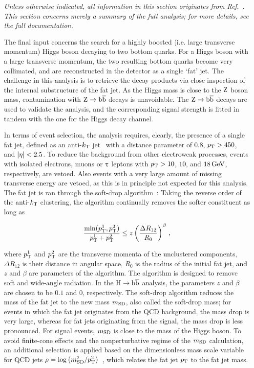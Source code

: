 \emph{%
Unless otherwise indicated, all information in this section originates from Ref.~\cite{Sirunyan:2017dgc}. This section concerns merely a summary of the full analysis; for more details, see the full documentation.
}

The final input concerns the search for a highly boosted (i.e. large transverse momentum) Higgs boson decaying to two bottom quarks.
% 
For a Higgs boson with a large transverse momentum, the two resulting bottom quarks become very collimated, and are reconstructed in the detector as a single `fat' jet.
% 
The challenge in this analysis is to retrieve the decay products via close inspection of the internal substructure of the fat jet.
% 
As the Higgs mass is close to the $\mathrm{Z}$ boson mass, contamination with $\mathrm{Z}\to\mathrm{b}\overline{\mathrm{b}}$ decays is unavoidable.
% 
The $\mathrm{Z}\to\mathrm{b}\overline{\mathrm{b}}$ decays are used to validate the analysis, and the corresponding signal strength is fitted in tandem with the one for the Higgs decay channel.


In terms of event selection, the analysis requires, clearly, the presence of a single fat jet, defined as an anti-$k_\mathrm{T}$ jet~\cite{Cacciari:2008gp} with a distance parameter of $0.8$, $p_\mathrm{T} > 450$\GeV, and $\left| \eta \right |<2.5$.
% 
To reduce the background from other electroweak processes, events with isolated electrons, muons or $\uptau$ leptons with $p_\mathrm{T} > 10$, $10$, and $18\,\text{GeV}$, respectively, are vetoed.
% 
Also events with a very large amount of missing transverse energy are vetoed, as this is in principle not expected for this analysis.
% 
The fat jet is ran through the soft-drop algorithm~\cite{Dasgupta:2013ihk,Larkoski:2014wba}: Taking the reverse order of the anti-$k_\mathrm{T}$ clustering, the algorithm continually removes the softer constituent as long as
% 
\begin{linenomath*}
\begin{equation}
\frac{ \text{min}( p_\mathrm{T}^1, p_\mathrm{T}^2 ) }{ p_\mathrm{T}^1 + p_\mathrm{T}^2 }
    \leq
    z \left( \frac{\Delta R_{12}}{R_0} \right)^\beta
\,,
\end{equation}
\end{linenomath*}
% 
where $p_\mathrm{T}^1$ and $p_\mathrm{T}^2$ are the transverse momenta of the unclustered components, $\Delta R_{12}$ is their distance in angular space, $R_0$ is the radius of the initial fat jet, and $z$ and $\beta$ are parameters of the algorithm.
% 
The algorithm is designed to remove soft and wide-angle radiation.
% 
In the $\mathrm{H}\to\mathrm{b}\overline{\mathrm{b}}$ analysis, the parameters $z$ and $\beta$ are chosen to be $0.1$ and $0$, respectively.
% 
The soft-drop algorithm reduces the mass of the fat jet to the new mass $m_\mathrm{SD}$, also called the soft-drop mass; for events in which the fat jet originates from the QCD background, the mass drop is very large, whereas for fat jets originating from the signal, the mass drop is less pronounced.
% 
For signal events, $m_\mathrm{SD}$ is close to the mass of the Higgs boson.
% 
To avoid finite-cone effects and the nonperturbative regime of the $m_\mathrm{SD}$ calculation, an additional selection is applied based on the dimensionless mass scale variable for QCD jets $\rho=\log\left(m_\mathrm{SD}^2/p_\mathrm{T}^2\right)$~\cite{Dasgupta:2013ihk}, which relates the fat jet $p_\mathrm{T}$ to the fat jet mass.


